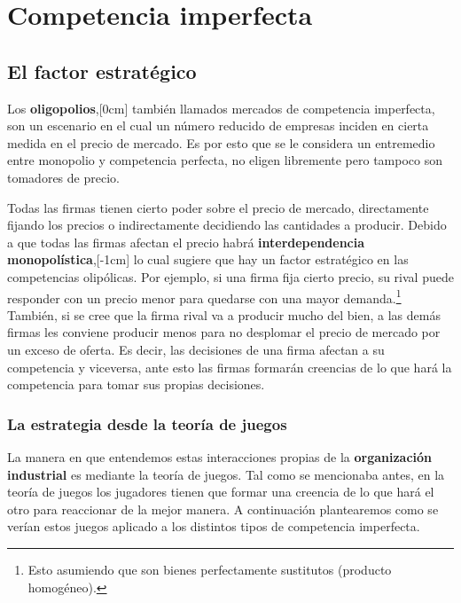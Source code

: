 \section{Competencia imperfecta}

\subsection{El factor estratégico}

Los \textbf{oligopolios},[0cm] también llamados mercados de competencia imperfecta, son un escenario en el cual un número reducido de empresas inciden en cierta medida en el precio de mercado. Es por esto que se le considera un entremedio entre monopolio y competencia perfecta, no eligen libremente pero tampoco son tomadores de precio. 

Todas las firmas tienen cierto poder sobre el precio de mercado, directamente fijando los precios o indirectamente decidiendo las cantidades a producir. Debido a que todas las firmas afectan el precio habrá \textbf{interdependencia monopolística},[-1cm] lo cual sugiere que hay un factor estratégico en las competencias olipólicas. Por ejemplo, si una firma fija cierto precio, su rival puede responder con un precio menor para quedarse con una mayor demanda.\footnote{Esto asumiendo que son bienes perfectamente sustitutos (producto homogéneo).} También, si se cree que la firma rival va a producir mucho del bien, a las demás firmas les conviene producir menos para no desplomar el precio de mercado por un exceso de oferta. Es decir, las decisiones de una firma afectan a su competencia y viceversa, ante esto las firmas formarán creencias de lo que hará la competencia para tomar sus propias decisiones. 

\subsubsection*{La estrategia desde la teoría de juegos}

La manera en que entendemos estas interacciones propias de la \textbf{organización industrial} es mediante la teoría de juegos. Tal como se mencionaba antes, en la teoría de juegos los jugadores tienen que formar una creencia de lo que hará el otro para reaccionar de la mejor manera. A continuación plantearemos como se verían estos juegos aplicado a los distintos tipos de competencia imperfecta. 

